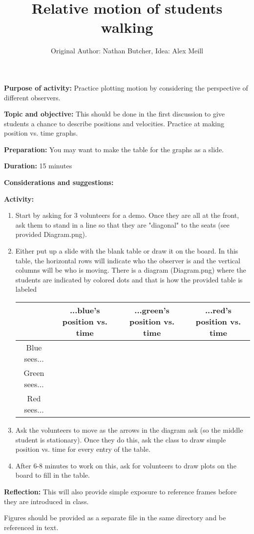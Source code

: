 \documentclass{article}
\title{Relative motion of students walking}
\author{Original Author: Nathan Butcher, Idea: Alex Meill}
\date{}
\begin{document}
\maketitle
\thispagestyle{empty}

\textbf{Purpose of activity:} Practice plotting motion by considering the perspective of different observers.

\textbf{Topic and objective:} This should be done in the first discussion to give students a chance to describe positions and velocities. Practice at making position vs. time graphs. 

\textbf{Preparation:} You may want to make the table for the graphs as a slide.

\textbf{Duration:} 15 minutes

\textbf{Considerations and suggestions:}

\hspace{14pt}

\textbf{Activity:}
\begin{enumerate}
\item Start by asking for 3 volunteers for a demo. Once they are all at the front, ask them to stand in a line so that they are "diagonal" to the seats (see provided Diagram.png).
\item Either put up a slide with the blank table or draw it on the board. In this table, the horizontal rows will indicate who the observer is and the vertical columns will be who is moving. There is a diagram (Diagram.png) where the students are indicated by colored dots and that is how the provided table is labeled

\begin{tabular}{| c | c | c | c |}
	\hline
	 & ...blue's position vs. time & ...green's position vs. time & ...red's position vs. time \\ \hline
	 Blue sees... & & & \\ \hline
	 Green sees... & & & \\ \hline 
	 Red sees... & & & \\ \hline
\end{tabular}

\item Ask the volunteers to move as the arrows in the diagram ask (so the middle student is stationary). Once they do this, ask the class to draw simple position vs. time for every entry of the table. 

\item After 6-8 minutes to work on this, ask for volunteers to draw plots on the board to fill in the table.
\end{enumerate}

\textbf{Reflection:} This will also provide simple exposure to reference frames before they are introduced in class.

\hspace{14pt}

Figures should be provided as a separate file in the same directory and be referenced in text.
\end{document}

